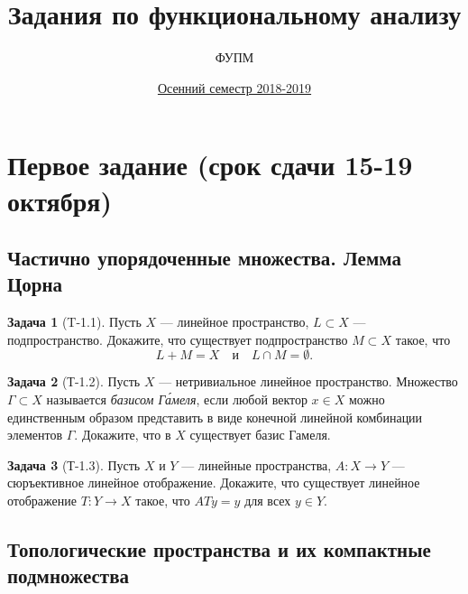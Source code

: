 \documentclass{article}
\theoremstyle{definition}
\newtheorem{problem}{Задача}
\begin{document}
\title{Задания по функциональному анализу}
\date{\href{https://mipt.ru/education/chair/mathematics/process/progs1/3_kyrs/10\%D1\%84.pdf}{Осенний семестр 2018-2019}}
\author{ФУПМ}
\maketitle

\tableofcontents

\section{Первое задание (срок сдачи 15-19 октября)}


\subsection{Частично упорядоченные множества. Лемма Цорна}


\begin{problem}[T-1.1]
Пусть $X$ --- линейное пространство, $L\subset X$ --- подпространство.
Докажите, что существует подпространство $M\subset X$ такое, что
\begin{equation*}
L+M = X \quad\text{и}\quad L \cap M = \emptyset.
\end{equation*}
\end{problem}

\begin{problem}[Т-1.2]
Пусть $X$ --- нетривиальное линейное пространство.
Множество $\Gamma \subset X$ называется \emph{базисом Г\'{а}меля},
если любой вектор $x\in X$ можно единственным образом представить
в виде конечной линейной комбинации элементов $\Gamma$.
Докажите, что в $X$ существует базис Гамеля.
\end{problem}

\begin{problem}[Т-1.3]
Пусть $X$ и $Y$ --- линейные пространства, $A\colon X\to Y$ ---
сюръективное линейное отображение. Докажите, что существует
линейное отображение $T\colon Y\to X$ такое, что $ATy = y$
для всех $y\in Y$.
\end{problem}

\subsection{Топологические пространства и их компактные подмножества}
\end{document}

